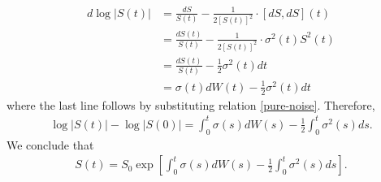 \documentclass[12pt,reqno]{amsart}
\numberwithin{equation}{section}  %
\begin{document}
\begin{equation*}
\begin{split}
d \log | S(t) |
& = \frac{dS}{S(t)} -\frac{1}{2[S(t)]^{2}} \cdot [dS, dS](t)
\\
& = \frac{dS(t)}{S(t)}  -\frac{1}{2[S(t)]^{2}} \cdot \sigma^{2}(t) S^{2}(t)
\\
& = \frac{dS(t)}{S(t)} - \frac{1}{2} \sigma^{2}(t) dt
\\
& = \sigma(t) d W(t) - \frac{1}{2} \sigma^{2}(t) dt
\end{split}
\end{equation*}
where the last line follows by substituting relation \eqref{pure-noise}. Therefore,
\begin{equation*}
\begin{split}
  \log | S(t) | - \log | S(0) | = \int_{0}^{t} \sigma(s) dW(s) -\frac{1}{2} \int_{0}^{t} \sigma^{2}(s) ds.
\end{split}
\end{equation*}
We conclude that
\begin{equation*}
\begin{split}
S(t) = S_{0} \exp[\int_{0}^{t} \sigma(s) dW(s) - \frac{1}{2} \int_{0}^{t} \sigma^{2}(s) ds].
\end{split}
\end{equation*}
\end{document}
